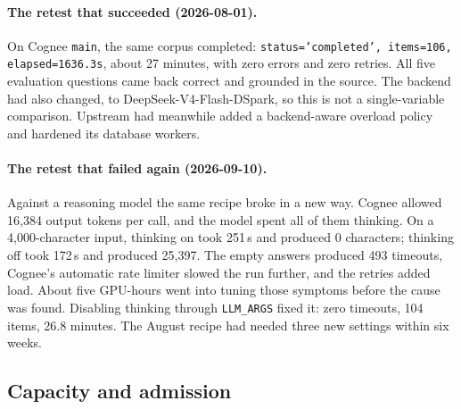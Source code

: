 \documentclass[11pt]{article}
\newcommand{\code}[1]{\texttt{#1}}
\begin{document}
\paragraph{The retest that succeeded (2026-08-01).} On Cognee \code{main}, the same corpus completed:
\code{status='completed', items=106, elapsed=1636.3s}, about 27 minutes, with zero errors and zero
retries. All five evaluation questions came back correct and grounded in the source. The backend had
also changed, to DeepSeek-V4-Flash-DSpark, so this is not a single-variable comparison. Upstream had
meanwhile added a backend-aware overload policy and hardened its database workers.

\paragraph{The retest that failed again (2026-09-10).} Against a reasoning model the same recipe
broke in a new way. Cognee allowed 16,384 output tokens per call, and the model spent all of them
thinking. On a 4,000-character input, thinking on took 251\,s and produced 0 characters; thinking off
took 172\,s and produced 25,397. The empty answers produced 493 timeouts, Cognee's automatic rate
limiter slowed the run further, and the retries added load. About five GPU-hours went into tuning
those symptoms before the cause was found. Disabling thinking through \code{LLM\_ARGS} fixed it: zero
timeouts, 104 items, 26.8 minutes. The August recipe had needed three new settings within six weeks.

\subsection{Capacity and admission}
\end{document}
